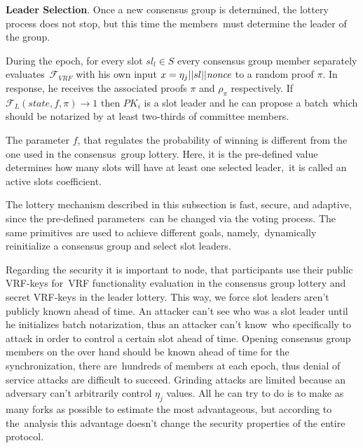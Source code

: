 \textbf{Leader Selection}.
Once a new consensus group is determined, the lottery process does not stop, but this time the members\
must determine the leader of the group.

During the epoch, for every slot ${sl_l \in S}$ every consensus group member separately evaluates\
${\mathcal{F}}_{VRF}$ with his own input ${x = \eta_j || sl || \emph{nonce}}$ to a random proof  $\pi$.
In response, he receives the associated proofs $\pi$ and $\rho_\pi$ respectively.
If ${\mathcal{F}}_{L}(state, f, \pi) \rightarrow 1$ then $PK_i$ is a slot leader and he can propose a batch\
which should be notarized by at least two-thirds of committee members.

The parameter $f$, that regulates the probability of winning is different from the one used in the consensus\
group lottery.
Here, it is the pre-defined value determines how many slots will have at least one selected leader,\
it is called an active slots coefficient.

The lottery mechanism described in this subsection is fast, secure, and adaptive, since the pre-defined parameters\
can be changed via the voting process.
The same primitives are used to achieve different goals, namely,\
dynamically reinitialize a consensus group and select slot leaders.

Regarding the security it is important to node, that participants use their public VRF-keys for\
VRF functionality evaluation in the consensus group lottery and secret VRF-keys in the leader lottery.
This way, we force slot leaders aren't publicly known ahead of time.
An attacker can't see who was a slot leader until he initializes batch notarization, thus an attacker can't know\
who specifically to attack in order to control a certain slot ahead of time.
Opening consensus group members on the over hand should be known ahead of time for the synchronization, there are\
hundreds of members at each epoch, thus denial of service attacks are difficult to succeed.
Grinding attacks are limited because an adversary can't arbitrarily control $\eta_j$ values.
All he can try to do is to make as many forks as possible to estimate the most advantageous, but according to the\
analysis this advantage doesn't change the security properties of the entire protocol.

